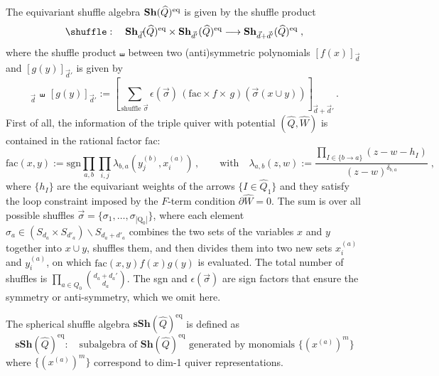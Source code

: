 \documentclass[12pt,a4paper]{article}
\def\lm{\limits}
\renewcommand{\(}{\left(}
\renewcommand{\)}{\right)}
\renewcommand{\(}{\left(}
\renewcommand{\)}{\right)}
\def\myequiv{:= }
\begin{document}
The equivariant shuffle algebra ${\bf Sh}(\widehat{Q})^{\textrm{eq}}$ is given by the shuffle product \cite{Kontsevich:2010px,yang2017,Galakhov:2021vbo}
\begin{equation}
\shuffle:\quad {\bf Sh}_{\vec{d}}(\widehat{Q})^{\textrm{eq}}_{}\times  {\bf Sh}_{\vec{d}'}(\widehat{Q})^{\textrm{eq}}_{}\longrightarrow  {\bf Sh}_{\vec{d}+\vec{d}'}(\widehat{Q})^{\textrm{eq}}_{}\;,
\end{equation}
where the shuffle product $\shuffle$ between  two (anti)symmetric polynomials $[f(x)]_{\vec{d}}$ and $[g(y)]_{\vec{d}'}$ is given by 
\begin{equation}
[f(x)]_{\vec{d}}
\ \shuffle \
[g(y)]_{\vec{d}'} :=\left[\sum_{\textrm{shuffle }\vec \sigma} \epsilon(\vec\sigma) \,(\mathrm{fac}\times f \times \,g)( \vec\sigma(x\cup y))\right]_{\vec{d} + \vec{d}'}\,.
\end{equation}
First of all, the information of the triple quiver with potential $(\widehat{Q},\widehat{W})$ is contained in the rational factor $\textrm{fac}$:
\begin{equation}\label{eq:facDef}
\textrm{fac}(x,y) := 
\textrm{sgn}
\prod_{{a,b}} 
\prod_{i,j} \lambda_{b,a}(y^{(b)}_j, x^{(a)}_i)\,, 
\qquad \textrm{with} \quad 
\lambda_{a,b}(z,w)\myequiv\frac{\prod\lm_{I\in\{b\to a\}}\left(z-w-h_I\right)}{\left(z-w\right)^{\delta_{b,a}}}\;,
\end{equation}
where $\{h_I\}$ are the equivariant weights of the arrows $\{I\in \widehat{Q}_1\}$ and they satisfy the loop constraint imposed by the $F$-term condition $\partial \widehat{W}=0$.
The sum is over all possible shuffles $\vec \sigma=\{\sigma_1,\dots,\sigma_{|\mathrm{Q}_0|}\}$, where each element 
$\sigma_a \in (S_{d_a} \times  S_{d'_a})\backslash S_{d_a+d'_a}$ 
combines the two sets of the variables $x$ and $y$ together into $x\cup y$, shuffles them, and then divides them  into two new sets $x^{(a)}_{i}$ and $y^{(a)}_{i}$, on which $\mathrm{fac}(x,y)f(x)g(y)$ is evaluated. 
The total number of shuffles is $\prod\lm_{a\in Q_0}\binom{d_a+d_a' }{d_a}$.
The sgn and $\epsilon(\vec{\sigma})$ are sign factors that ensure the symmetry or anti-symmetry, which we omit here.

\medskip

The spherical shuffle algebra  $\mathbf{sSh}(\widehat{Q})^{\textrm{eq}}$ is defined as
\begin{equation}
\mathbf{sSh}(\widehat{Q})^{\textrm{eq}}
:\quad 
\textrm{subalgebra of } \mathbf{Sh}(\widehat{Q})^{\textrm{eq}} 
\textrm{ generated by monomials } 
\{ (x^{(a)})^m \}
\end{equation}
where $\{ (x^{(a)})^m \}$ correspond to dim-1 quiver representations.
\end{document}
